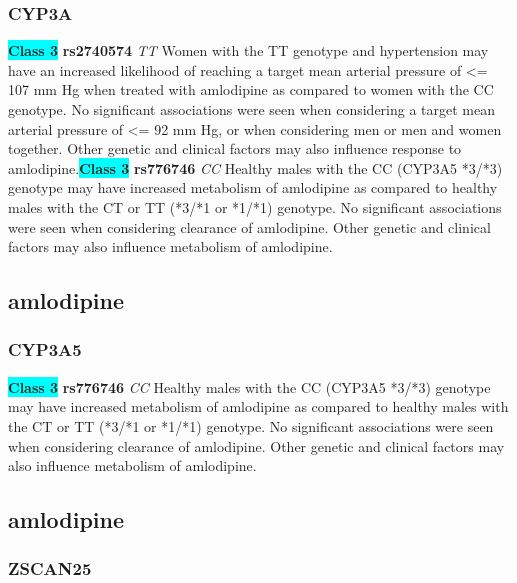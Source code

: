 \documentclass{book}
\begin{document}
\subsubsection{ CYP3A }

\begin{center}
\textbf{\colorbox{cyan} {Class 3}} \textbf{ rs2740574 } \textit{ TT }
Women with the TT genotype and hypertension may have an increased likelihood of reaching a target mean arterial pressure of <= 107 mm Hg when treated with amlodipine as compared to women with the CC genotype. No significant associations were seen when considering a target mean arterial pressure of <= 92 mm Hg, or when considering men or men and women together. Other genetic and clinical factors may also influence response to amlodipine.\textbf{\colorbox{cyan} {Class 3}} \textbf{ rs776746 } \textit{ CC }
Healthy males with the CC (CYP3A5 *3/*3) genotype may have increased metabolism of amlodipine as compared to healthy males with the CT or TT (*3/*1 or *1/*1) genotype. No significant associations were seen when considering clearance of amlodipine. Other genetic and clinical factors may also influence metabolism of amlodipine.


\end{center}\subsection{ amlodipine }


\subsubsection{ CYP3A5 }

\begin{center}
\textbf{\colorbox{cyan} {Class 3}} \textbf{ rs776746 } \textit{ CC }
Healthy males with the CC (CYP3A5 *3/*3) genotype may have increased metabolism of amlodipine as compared to healthy males with the CT or TT (*3/*1 or *1/*1) genotype. No significant associations were seen when considering clearance of amlodipine. Other genetic and clinical factors may also influence metabolism of amlodipine.


\end{center}\subsection{ amlodipine }


\subsubsection{ ZSCAN25 }
\end{document}

